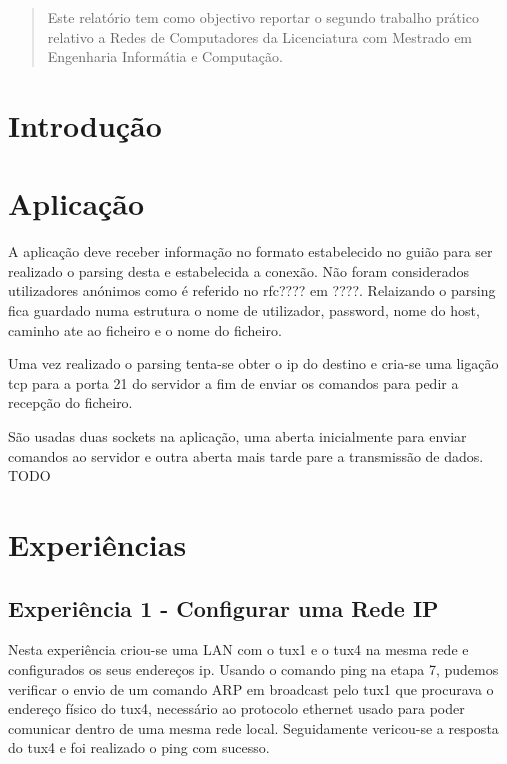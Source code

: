 \documentclass[11pt,a4paper,reqno]{report}
\numberwithin{equation}{section}
\begin{document}



\begin{abstract}
	
Este relatório tem como objectivo reportar o segundo trabalho prático relativo a Redes de Computadores da Licenciatura com Mestrado em Engenharia Informátia e Computação. 


\end{abstract}

\tableofcontents

\chapter{Introdução}


	
\chapter{Aplicação}

A aplicação deve receber informação no formato estabelecido no guião para ser realizado o parsing desta e estabelecida a conexão. Não foram considerados utilizadores anónimos como é referido no rfc???? em ????. Relaizando o parsing fica guardado numa estrutura o nome de utilizador, password, nome do host, caminho ate ao ficheiro e o nome do ficheiro.

Uma vez realizado o parsing tenta-se obter o ip do destino e cria-se uma ligação tcp para a porta 21 do servidor a fim de enviar os comandos para pedir a recepção do ficheiro.

São usadas duas sockets na aplicação, uma aberta inicialmente para enviar comandos ao servidor e outra aberta mais tarde pare a transmissão de dados. 
TODO

\chapter{Experiências}

\section{Experiência 1 - Configurar uma Rede IP}

Nesta experiência criou-se uma LAN com o tux1 e o tux4 na mesma rede e configurados os seus endereços ip. Usando o comando ping na etapa 7, pudemos verificar o envio de um comando ARP em broadcast pelo tux1 que procurava o endereço físico do tux4, necessário ao protocolo ethernet usado para poder comunicar dentro de uma mesma rede local. Seguidamente vericou-se a resposta do tux4 e foi realizado o ping com sucesso.
\end{document}
